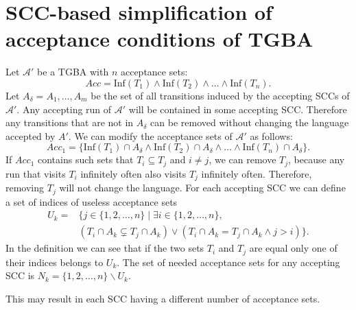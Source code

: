 \documentclass[
  digital, %
  twoside, %
  table,   %
  lof,     %
  lot,     %
]{fithesis3}
\begin{document}
\chapter{SCC-based simplification of acceptance conditions of TGBA} 
Let $\mathcal{A'}$ be a TGBA with $n$ acceptance sets: 
\begin{equation*}
  Acc = \text{Inf}(T_1) \wedge \text{Inf}(T_2) \wedge \dots \wedge \text{Inf}(T_n).
\end{equation*}
Let $A_\delta = A_1, \dots, A_m$ be the set of all transitions induced by the accepting SCCs of $\mathcal{A'}$. 
Any accepting run of $\mathcal{A'}$ will be contained in some accepting SCC. Therefore any transitions that are not in $A_\delta$ can be removed without changing the language accepted by $A'$. We can modify the acceptance sets of $\mathcal{A'}$ as follows: 
\begin{equation*}
  Acc_1 = \{ \text{Inf}(T_1) \cap A_\delta \wedge \text{Inf}(T_2) \cap A_\delta \wedge \dots \wedge \text{Inf}(T_n) \cap A_\delta \}.
\end{equation*}
If $Acc_1$ contains such sets that $T_i \subseteq T_j$ and $i \neq j$, we can remove $T_j$, because any run that visits $T_i$ infinitely often also visits $T_j$ infinitely often. Therefore, removing $T_j$ will not change the language.
For each accepting SCC we can define a set of indices of useless acceptance sets 
\begin{equation*}
  \begin{aligned}
    U_k = &\{ j \in \{1, 2, \dots, n\} \mid \exists i \in \{1, 2, \dots, n\}, \\
    &(T_i \cap A_k \subsetneq T_j \cap A_k) \vee (T_i \cap A_k = T_j \cap A_k \wedge j > i)\}.
  \end{aligned}
\end{equation*}
In the definition we can see that if the two sets $T_i$ and $T_j$ are equal only one of their indices belongs to $U_k$. The set of needed acceptance sets for any accepting SCC is $N_k = \{1, 2, \dots, n\} \smallsetminus U_k$. 

This may result in each SCC having a different number of acceptance sets. 


\begin{center}
\end{center}
\end{document}
